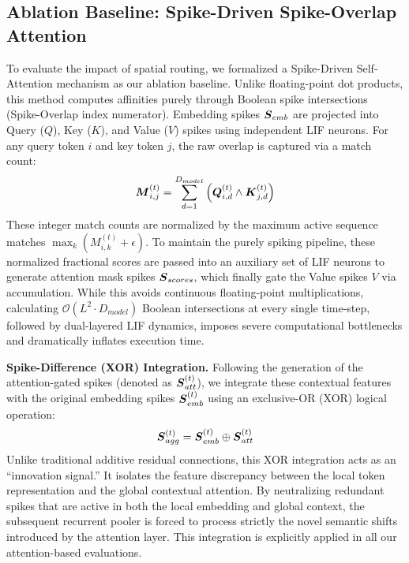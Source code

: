 \documentclass[10pt,a4paper,twoside]{article}
\begin{document}
\subsection{Ablation Baseline: Spike-Driven Spike-Overlap Attention}
To evaluate the impact of spatial routing, we formalized a Spike-Driven Self-Attention mechanism as our ablation baseline. Unlike floating-point dot products, this method computes affinities purely through Boolean spike intersections (Spike-Overlap index numerator).
Embedding spikes $\boldsymbol{S}_{emb}$ are projected into Query ($Q$), Key ($K$), and Value ($V$) spikes using independent LIF neurons. For any query token $i$ and key token $j$, the raw overlap is captured via a match count:
\begin{equation}
\boldsymbol{M}_{i,j}^{(t)} = \sum_{d=1}^{D_{model}} \left( \boldsymbol{Q}_{i,d}^{(t)} \wedge \boldsymbol{K}_{j,d}^{(t)} \right)
\end{equation}
These integer match counts are normalized by the maximum active sequence matches $\max_k (M_{i,k}^{(t)} + \epsilon)$. To maintain the purely spiking pipeline, these normalized fractional scores are passed into an auxiliary set of LIF neurons to generate attention mask spikes $\boldsymbol{S}_{scores}$, which finally gate the Value spikes $V$ via accumulation.
While this avoids continuous floating-point multiplications, calculating $\mathcal{O}(L^2 \cdot D_{model})$ Boolean intersections at every single time-step, followed by dual-layered LIF dynamics, imposes severe computational bottlenecks and dramatically inflates execution time.

\textbf{Spike-Difference (XOR) Integration.} Following the generation of the attention-gated spikes (denoted as $\boldsymbol{S}_{att}^{(t)}$), we integrate these contextual features with the original embedding spikes $\boldsymbol{S}_{emb}^{(t)}$ using an exclusive-OR (XOR) logical operation:
\begin{equation}
\boldsymbol{S}_{agg}^{(t)} = \boldsymbol{S}_{emb}^{(t)} \oplus \boldsymbol{S}_{att}^{(t)}
\end{equation}
Unlike traditional additive residual connections, this XOR integration acts as an ``innovation signal.'' It isolates the feature discrepancy between the local token representation and the global contextual attention. By neutralizing redundant spikes that are active in both the local embedding and global context, the subsequent recurrent pooler is forced to process strictly the novel semantic shifts introduced by the attention layer. This integration is explicitly applied in all our attention-based evaluations.
\end{document}
